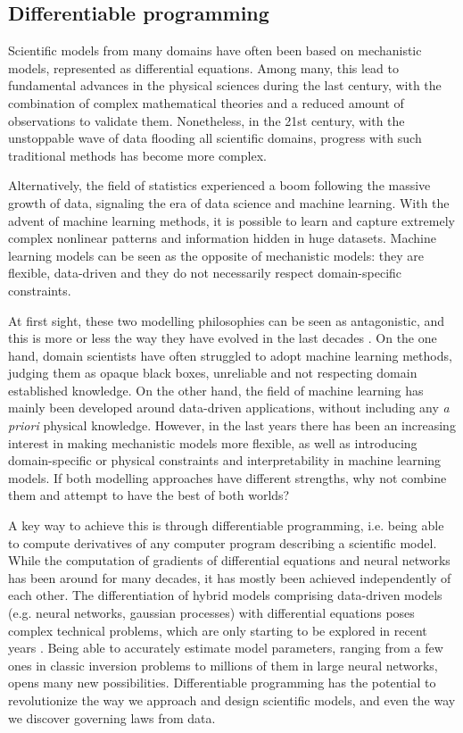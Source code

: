 \subsection{Differentiable programming}

Scientific models from many domains have often been based on mechanistic models, represented as differential equations. 
Among many, this lead to fundamental advances in the physical sciences during the last century, with the combination of complex mathematical theories and a reduced amount of observations to validate them. 
Nonetheless, in the 21st century, with the unstoppable wave of data flooding all scientific domains, progress with such traditional methods has become more complex. 

Alternatively, the field of statistics experienced a boom following the massive growth of data, signaling the era of data science and machine learning.
With the advent of machine learning methods, it is possible to learn and capture extremely complex nonlinear patterns and information hidden in huge datasets. 
Machine learning models can be seen as the opposite of mechanistic models: they are flexible, data-driven and they do not necessarily respect domain-specific constraints.

At first sight, these two modelling philosophies can be seen as antagonistic, and this is more or less the way they have evolved in the last decades \cite{zdeborova_understanding_2020}. 
On the one hand, domain scientists have often struggled to adopt machine learning methods, judging them as opaque black boxes, unreliable and not respecting domain established knowledge. 
On the other hand, the field of machine learning has mainly been developed around data-driven applications, without including any \textit{a priori} physical knowledge. 
However, in the last years there has been an increasing interest in making mechanistic models more flexible, as well as introducing domain-specific or physical constraints and interpretability in machine learning models. 
If both modelling approaches have different strengths, why not combine them and attempt to have the best of both worlds?

A key way to achieve this is through differentiable programming, i.e. being able to compute derivatives of any computer program describing a scientific model.
While the computation of gradients of differential equations and neural networks has been around for many decades, it has mostly been achieved independently of each other. 
The differentiation of hybrid models comprising data-driven models (e.g. neural networks, gaussian processes) with differential equations poses complex technical problems, which are only starting to be explored in recent years \cite{ma_comparison_2021}. 
Being able to accurately estimate model parameters, ranging from a few ones in classic inversion problems to millions of them in large neural networks, opens many new possibilities. 
Differentiable programming has the potential to revolutionize the way we approach and design scientific models, and even the way we discover governing laws from data. 

